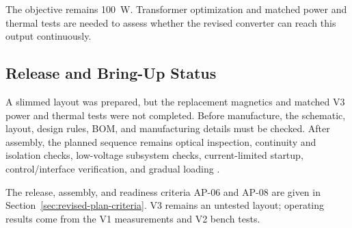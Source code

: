 The objective remains \SI{100}{\watt}. Transformer optimization and
matched power and thermal tests are needed to assess whether the revised
converter can reach this output continuously.

\subsection{Release and Bring-Up Status}

A slimmed layout was prepared, but the replacement magnetics and matched
V3 power and thermal tests were not completed. Before manufacture, the
schematic, layout, design rules, BOM, and manufacturing details must be
checked. After assembly, the planned sequence remains optical inspection,
continuity and isolation checks, low-voltage subsystem checks,
current-limited startup, control/interface verification, and gradual
loading \cite{projectOctoberPlan}.

The release, assembly, and readiness criteria AP-06 and AP-08 are given
in Section~\ref{sec:revised-plan-criteria}. V3 remains an untested layout;
operating results come from the V1 measurements and V2 bench tests.
